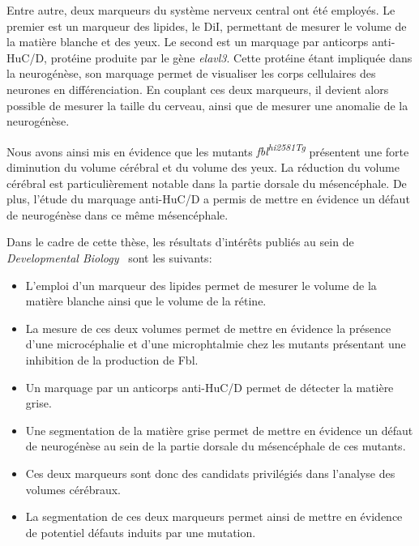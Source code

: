 \documentclass[\main/main.tex]{subfiles}
\begin{document}
%
Entre autre, deux marqueurs du système nerveux central ont été employés.
%
Le premier est un marqueur des lipides, le DiI, permettant de mesurer le volume de la matière blanche et des yeux.
%
Le second est un marquage par anticorps anti-HuC/D, protéine produite par le gène \textit{elavl3}.
%
Cette protéine étant impliquée dans la neurogénèse, son marquage permet de visualiser les corps cellulaires des neurones en différenciation.
%
En couplant ces deux marqueurs, il devient alors possible de mesurer la taille du cerveau, ainsi que de mesurer une anomalie de la neurogénèse.

%
Nous avons ainsi mis en évidence que les mutants \textit{fbl\textsuperscript{hi2581Tg}}
présentent une forte diminution du volume cérébral et du volume des yeux.
%
La réduction du volume cérébral est particulièrement notable
dans la partie dorsale du mésencéphale.
%
De plus, l'étude du marquage anti-HuC/D a permis de mettre en évidence
un défaut de neurogénèse dans ce même mésencéphale.

%
Dans le cadre de cette thèse, les résultats d'intérêts publiés au sein de
\emph{Developmental Biology}~\citep{bouffard_2018} sont les suivants:

\begin{itemize}
    
    \item
    L'emploi d'un marqueur des lipides permet de mesurer le volume de la matière blanche
    ainsi que le volume de la rétine.
    
    \item
    La mesure de ces deux volumes permet de mettre en évidence la présence d'une microcéphalie
    et d'une microphtalmie chez les mutants présentant une inhibition de la production de Fbl.
    
    \item
    Un marquage par un anticorps anti-HuC/D permet de détecter la matière grise.
    
    \item
    Une segmentation de la matière grise permet de mettre en évidence
    un défaut de neurogénèse au sein de la partie dorsale du mésencéphale de ces mutants.
    
    \item
    Ces deux marqueurs sont donc des candidats privilégiés
    dans l'analyse des volumes cérébraux.
    
    \item
    La segmentation de ces deux marqueurs permet ainsi de mettre en évidence
    de potentiel défauts induits par une mutation.
    
\end{itemize}
\end{document}
